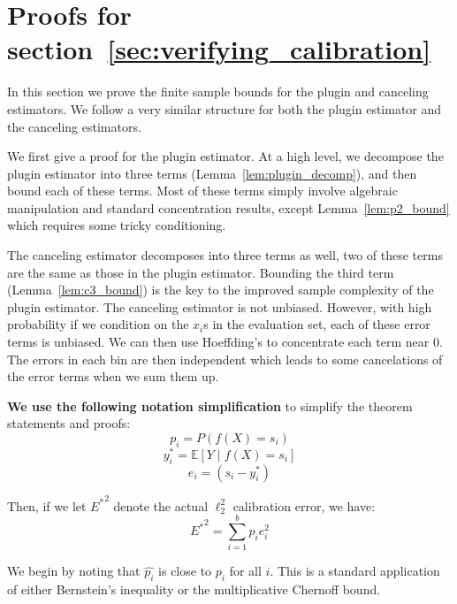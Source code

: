 \newpage

\section{Proofs for section~\ref{sec:verifying_calibration}}


In this section we prove the finite sample bounds for the plugin and canceling estimators. We follow a very similar structure for both the plugin estimator and the canceling estimators.

We first give a proof for the plugin estimator. At a high level, we decompose the plugin estimator into three terms (Lemma~\ref{lem:plugin_decomp}), and then bound each of these terms. Most of these terms simply involve algebraic manipulation and standard concentration results, except Lemma~\ref{lem:p2_bound} which requires some tricky conditioning.

The canceling estimator decomposes into three terms as well, two of these terms are the same as those in the plugin estimator. Bounding the third term (Lemma~\ref{lem:c3_bound}) is the key to the improved sample complexity of the plugin estimator. The canceling estimator is not unbiased. However, with high probability if we condition on the $x_i$s in the evaluation set, each of these error terms is unbiased. We can then use Hoeffding's to concentrate each term near 0. The errors in each bin are then independent which leads to some cancelations of the error terms when we sum them up.

\textbf{We use the following notation simplification} to simplify the theorem statements and proofs:
\[ p_i = P(f(X) = s_i) \]
\[ y_i^* = \mathbb{E}[Y \; | \; f(X) = s_i] \]
\[ e_i = (s_i - y_i^*) \]

Then, if we let ${E^*}^2$ denote the actual $\ell_2^2$ calibration error, we have:
\[ {E^*}^2 = \sum_{i=1}^b p_i e_i^2 \]


We begin by noting that $\hat{p_i}$ is close to $p_i$ for all $i$. This is a standard application of either Bernstein's inequality or the multiplicative Chernoff bound.

